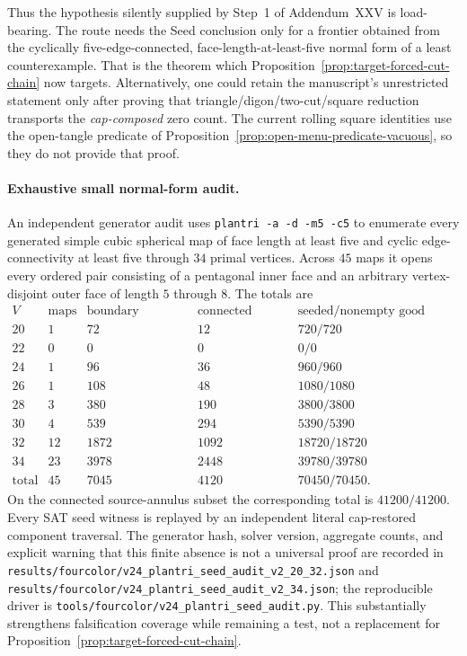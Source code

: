 Thus the hypothesis silently supplied by Step~1 of Addendum~XXV is
load-bearing.  The route needs the Seed conclusion only for a frontier
obtained from the cyclically five-edge-connected, face-length-at-least-five
normal form of a least counterexample.  That is the theorem which
Proposition~\ref{prop:target-forced-cut-chain} now targets.  Alternatively,
one could retain the manuscript's unrestricted statement only after proving
that triangle/digon/two-cut/square reduction transports the
\emph{cap-composed} zero count.  The current rolling square identities use
the open-tangle predicate of
Proposition~\ref{prop:open-menu-predicate-vacuous}, so they do not provide
that proof.

\paragraph{Exhaustive small normal-form audit.}
An independent generator audit uses
\texttt{plantri -a -d -m5 -c5} to enumerate every generated simple cubic
spherical map of face length at least five and cyclic edge-connectivity at
least five through $34$ primal vertices.  Across $45$ maps it opens every
ordered pair consisting of a pentagonal inner face and an arbitrary
vertex-disjoint outer face of length $5$ through $8$.  The totals are
\[
\begin{array}{c|r|r|r|r}
V&\text{maps}&\text{boundary openings}&\text{connected annuli}
 &\text{seeded/nonempty good fibres}\\ \hline
20&1&72&12&720/720\\
22&0&0&0&0/0\\
24&1&96&36&960/960\\
26&1&108&48&1080/1080\\
28&3&380&190&3800/3800\\
30&4&539&294&5390/5390\\
32&12&1872&1092&18720/18720\\
34&23&3978&2448&39780/39780\\ \hline
\text{total}&45&7045&4120&70450/70450.
\end{array}
\]
On the connected source-annulus subset the corresponding total is
$41200/41200$.  Every SAT seed witness is replayed by an independent
literal cap-restored component traversal.  The generator hash, solver
version, aggregate counts, and explicit warning that this finite absence is
not a universal proof are recorded in
\texttt{results/fourcolor/v24\_plantri\_seed\_audit\_v2\_20\_32.json}
and \texttt{results/fourcolor/v24\_plantri\_seed\_audit\_v2\_34.json};
the reproducible driver is
\texttt{tools/fourcolor/v24\_plantri\_seed\_audit.py}.  This substantially
strengthens falsification coverage while remaining a test, not a replacement
for Proposition~\ref{prop:target-forced-cut-chain}.

